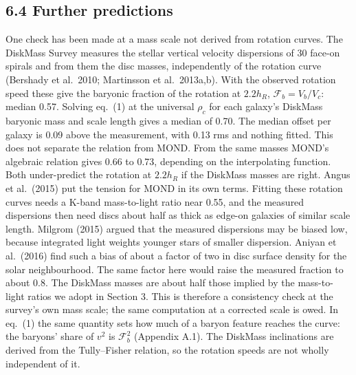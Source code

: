 \documentclass[
  10pt,
]{article}
\begin{document}
\subsection{6.4 Further predictions}

One check has been made at a mass scale not derived from rotation curves. The DiskMass Survey measures the stellar vertical velocity dispersions of 30 face-on spirals and from them the disc masses, independently of the rotation curve (Bershady et al.~2010; Martinsson et al.~2013a,b). With the observed rotation speed these give the baryonic fraction of the rotation at $2.2h_R$, $\mathcal{F}_b=V_b/V_c$: median 0.57. Solving eq.~(1) at the universal $\rho_c$ for each galaxy's DiskMass baryonic mass and scale length gives a median of 0.70. The median offset per galaxy is 0.09 above the measurement, with 0.13 rms and nothing fitted. This does not separate the relation from MOND. From the same masses MOND's algebraic relation gives 0.66 to 0.73, depending on the interpolating function. Both under-predict the rotation at $2.2h_R$ if the DiskMass masses are right. Angus et al.~(2015) put the tension for MOND in its own terms. Fitting these rotation curves needs a K-band mass-to-light ratio near 0.55, and the measured dispersions then need discs about half as thick as edge-on galaxies of similar scale length. Milgrom (2015) argued that the measured dispersions may be biased low, because integrated light weights younger stars of smaller dispersion. Aniyan et al.~(2016) find such a bias of about a factor of two in disc surface density for the solar neighbourhood. The same factor here would raise the measured fraction to about 0.8. The DiskMass masses are about half those implied by the mass-to-light ratios we adopt in Section 3. This is therefore a consistency check at the survey's own mass scale; the same computation at a corrected scale is owed. In eq.~(1) the same quantity sets how much of a baryon feature reaches the curve: the baryons' share of $v^2$ is $\mathcal{F}_b^2$ (Appendix A.1). The DiskMass inclinations are derived from the Tully--Fisher relation, so the rotation speeds are not wholly independent of it.
\end{document}
